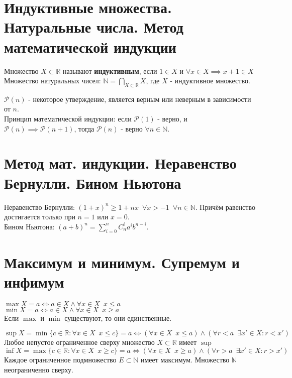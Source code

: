 \documentclass[11pt, a4paper, utf-8]{article}
\def\R{\mathbb{R}}
\def\N{\mathbb{N}}
\def\sp{\, \, \,}
\begin{document}
    \section{Индуктивные множества. Натуральные числа. Метод математической индукции}
    Множество $X \subset \R$ называют \textbf{индуктивным}, если $1 \in X$ и $\forall x \in X \implies x+1 \in X$\\
    Множество натуральных чисел: $\displaystyle \N = \bigcap_{X \subset \R} X$, где $X$ - индуктивное множество.
    
    $\mathcal{P}(n)$ - некоторое утверждение, является верным или неверным в зависимости от $n$.\\
    Принцип математической индукции: если $\mathcal{P}(1)$ - верно, и $\mathcal{P}(n) \implies \mathcal{P}(n+1)$, тогда $\mathcal{P}(n)$ - верно $\forall n \in \N$.

    \section{Метод мат. индукции. Неравенство Бернулли. Бином Ньютона}
    Неравенство Бернулли: $(1+x)^n \geq 1+nx \sp \forall x > -1 \sp \forall n \in \N$. Причём равенство достигается только при $n = 1$ или $x = 0$.\\
    Бином Ньютона: $\displaystyle (a+b)^n = \sum_{i=0}^n C_n^i a^i b^{n-i}$.

    \section{Максимум и минимум. Супремум и инфимум}
    $\max X = a \iff a \in X \land \forall x \in X \sp x \leq a$\\
    $\min X = a \iff a \in X \land \forall x \in X \sp x \geq a$\\
    Если $\max$ и $\min$ существуют, то они единственные.

    $\sup X = \min \{c \in \R: \forall x \in X \sp x \leq c\} = a \iff (\forall x \in X \sp x \leq a) \land (\forall r < a \sp \exists x' \in X: r < x')$\\
    Любое непустое ограниченное сверху множество $X \subset \R$ имеет $\sup$\\
    $\inf X = \max \{c \in \R: \forall x \in X \sp x \geq c\} = a \iff (\forall x \in X \sp x \geq a) \land (\forall r > a \sp \exists x' \in X: r > x')$\\

    Каждое ограниченное подмножество $E \subset \N$ имеет максимум. Множество $\N$ неограниченно сверху.
\end{document}
